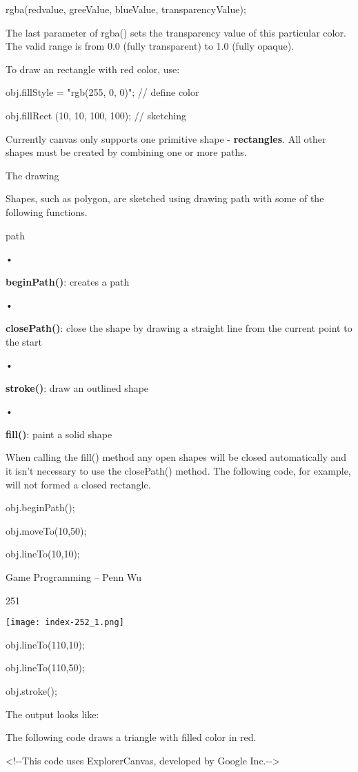 \documentclass[
]{article}
\begin{document}
rgba(redvalue, greeValue, blueValue, transparencyValue);

The last parameter of rgba() sets the transparency value of this
particular color. The valid range is from 0.0 (fully transparent) to 1.0
(fully opaque).

To draw an rectangle with red color, use:

obj.fillStyle = "rgb(255, 0, 0)"; // define color

obj.fillRect (10, 10, 100, 100); // sketching

Currently canvas only supports one primitive shape -
\textbf{rectangles}. All other shapes must be created by combining one
or more paths.

The drawing

Shapes, such as polygon, are sketched using drawing path with some of
the following functions.

path

•

\textbf{beginPath()}: creates a path

•

\textbf{closePath()}: close the shape by drawing a straight line from
the current point to the start

•

\textbf{stroke()}: draw an outlined shape

•

\textbf{fill()}: paint a solid shape

When calling the fill() method any open shapes will be closed
automatically and it isn't necessary to use the closePath() method. The
following code, for example, will not formed a closed rectangle.

obj.beginPath();

obj.moveTo(10,50);

obj.lineTo(10,10);

Game Programming -- Penn Wu

251

\protect\hypertarget{index_split_013.htmlux5cux23p252}{}{}\texttt{[image: index-252\_1.png]}

obj.lineTo(110,10);

obj.lineTo(110,50);

obj.stroke();

The output looks like:

The following code draws a triangle with filled color in red.

\textless!-\/-This code uses ExplorerCanvas, developed by Google
Inc.-\/-\textgreater{}
\end{document}

